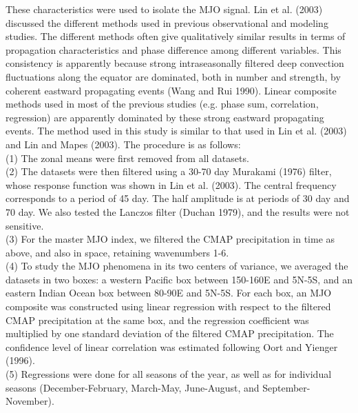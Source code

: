 \documentclass[12pt]{article}
\begin{document}
These characteristics were used to isolate the MJO signal. Lin et al. (2003)
discussed the different methods used in previous observational and
modeling studies. The different methods often give
qualitatively similar results in terms of propagation characteristics
and phase difference among different variables.
This consistency is apparently
because strong intraseasonally filtered deep convection fluctuations along the
equator are dominated, both in number and strength, by coherent
eastward propagating events (Wang and Rui 1990).  Linear composite
methods used in most of the previous studies (e.g. phase sum,
correlation, regression) are apparently dominated by these strong
eastward propagating events.
The method used in this study is similar to that used 
in Lin et al. (2003) and Lin and Mapes (2003). The procedure is as follows:\\
(1) The zonal means were first removed from all datasets.\\
(2) The datasets were then filtered using a 30-70 day Murakami (1976) filter,
whose response function was shown in Lin et al. (2003).  The central
frequency corresponds to a period of 45 day.  The half amplitude is at
periods of 30 day and 70 day.  
We also tested the Lanczos filter (Duchan 1979), and the results were
not sensitive.\\
(3) For the master MJO index, we filtered the CMAP precipitation in time
as above, and also in space, retaining wavenumbers 1-6.\\
(4) To study the MJO phenomena in its two centers of variance, we averaged
the datasets in two boxes: a western Pacific box between 150-160E and 5N-5S,
and an eastern Indian Ocean box between 80-90E and 5N-5S.
For each box, an MJO composite was constructed using
linear regression with respect to the filtered CMAP precipitation at the
same box, and the regression coefficient was multiplied by one standard
deviation of the filtered CMAP precipitation.
The confidence level of linear correlation
was estimated following Oort and Yienger (1996).  \\
(5) Regressions were done for
all seasons of the year, as well as for individual seasons
(December-February, March-May, June-August, and September-November).
\\
 

\end{document}
